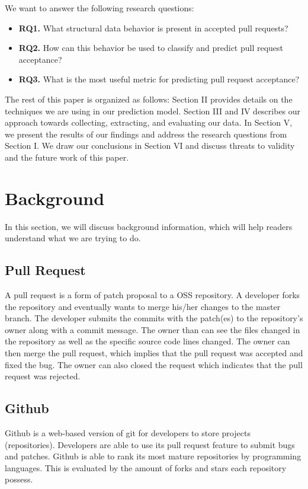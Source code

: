 \documentclass[10pt, conference]{IEEEtran}
\begin{document}
We want to answer the following research questions:
\begin{mdframed} 
\begin{itemize}
\item \textbf{RQ1.} What structural data behavior is present in accepted pull requests?
\item \textbf{RQ2.} How can this behavior be used to classify and predict pull request acceptance?
\item \textbf{RQ3.} What is the most useful metric for predicting pull request acceptance?
\end{itemize}
\end{mdframed}

The rest of this paper is organized as follows: 
Section II provides details on the techniques we are using in our prediction model. Section III and IV describes our approach towards collecting, extracting, and evaluating our data. In Section V, we present the results of our findings and address the research questions from Section I. We draw our conclusions in Section VI and discuss threats to validity and the future work of this paper.

\section{Background}
In this section, we will discuss background information, which will help readers understand what we are trying to do.

\subsection{Pull Request}
A pull request is a form of patch proposal to a OSS repository. A developer forks the repository and eventually wants to merge his/her changes to the master branch. The developer submits the commits with the patch(es) to the repository's owner along with a commit message. The owner than can see the files changed in the repository as well as the specific source code lines changed. The owner can then merge the pull request, which implies that the pull request was accepted and fixed the bug. The owner can also closed the request which indicates that the pull request was rejected.

\subsection{Github}
Github is a web-based version of git for developers to store projects (repositories). Developers are able to use its pull request feature to submit bugs and patches. Github is able to rank its most mature repositories by programming languages. This is evaluated by the amount of forks and stars each repository possess. 
\end{document}
